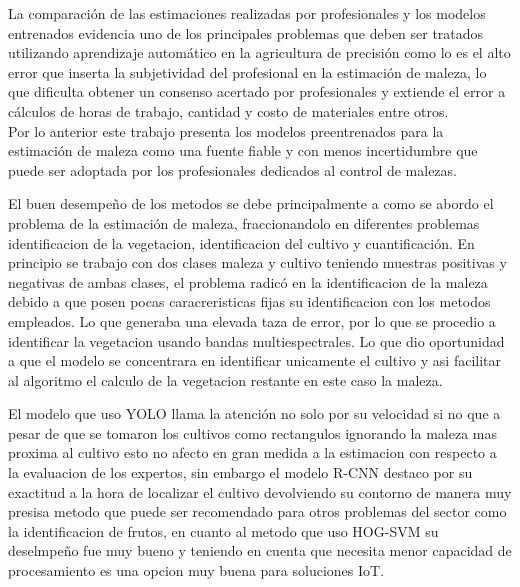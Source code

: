 \documentclass[journal,article,submit,moreauthors,pdftex]{Definitions/mdpi}
\begin{document}
La comparación de las estimaciones realizadas por profesionales y los modelos entrenados evidencia uno de los principales problemas que deben ser tratados utilizando aprendizaje automático en la agricultura de precisión como lo es el alto error que inserta la subjetividad del profesional en la estimación de maleza, lo que dificulta obtener un consenso acertado por profesionales y extiende el error a cálculos de horas de trabajo, cantidad y costo de materiales entre otros.
\\
Por lo anterior este trabajo presenta los modelos preentrenados para la estimación de maleza como una fuente fiable y con menos incertidumbre que puede ser adoptada por los profesionales dedicados al control de malezas.

El buen desempeño de los metodos se debe principalmente a como se abordo el problema de la estimación de maleza, fraccionandolo en diferentes problemas identificacion de la vegetacion, identificacion del cultivo y cuantificación. En principio se trabajo con dos clases maleza y cultivo teniendo muestras positivas y negativas de ambas clases, el problema radicó en la identificacion de la maleza debido a que posen pocas caracreristicas fijas su identificacion con los metodos empleados. Lo que generaba una elevada taza de error, por lo que se procedio a identificar la vegetacion usando bandas multiespectrales. Lo que dio oportunidad a que el modelo se concentrara en identificar unicamente el cultivo y asi facilitar al algoritmo el calculo de la vegetacion restante en este caso la maleza.

El modelo que uso YOLO llama la atención no solo por su velocidad si no que a pesar de que se tomaron los cultivos como rectangulos ignorando la maleza mas proxima al cultivo esto no afecto en gran medida a la estimacion con respecto a la evaluacion de los expertos, sin embargo el modelo R-CNN destaco por su exactitud a la hora de localizar el cultivo devolviendo su contorno de manera muy presisa metodo que puede ser recomendado para otros problemas del sector como la identificacion de frutos, en cuanto al metodo que uso HOG-SVM su deselmpeño fue muy bueno y teniendo en cuenta que necesita menor capacidad de procesamiento es una opcion muy buena para soluciones IoT.
\end{document}
